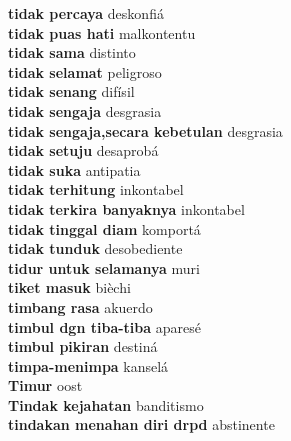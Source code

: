 \textbf{ tidak percaya  } deskonfiá \\
\textbf{ tidak puas hati  } malkontentu \\
\textbf{ tidak sama  } distinto \\
\textbf{ tidak selamat  } peligroso \\
\textbf{ tidak senang  } difísil \\
\textbf{ tidak sengaja  } desgrasia \\
\textbf{ tidak sengaja,secara kebetulan  } desgrasia \\
\textbf{ tidak setuju  } desaprobá \\
\textbf{ tidak suka  } antipatia \\
\textbf{ tidak terhitung  } inkontabel \\
\textbf{ tidak terkira banyaknya  } inkontabel \\
\textbf{ tidak tinggal diam  } komportá \\
\textbf{ tidak tunduk  } desobediente \\
\textbf{ tidur untuk selamanya  } muri \\
\textbf{ tiket masuk  } bièchi \\
\textbf{ timbang rasa  } akuerdo \\
\textbf{ timbul dgn tiba-tiba  } aparesé \\
\textbf{ timbul pikiran  } destiná \\
\textbf{ timpa-menimpa  } kanselá \\
\textbf{ Timur  } oost \\
\textbf{ Tindak kejahatan  } banditismo \\
\textbf{ tindakan menahan diri drpd  } abstinente \\
